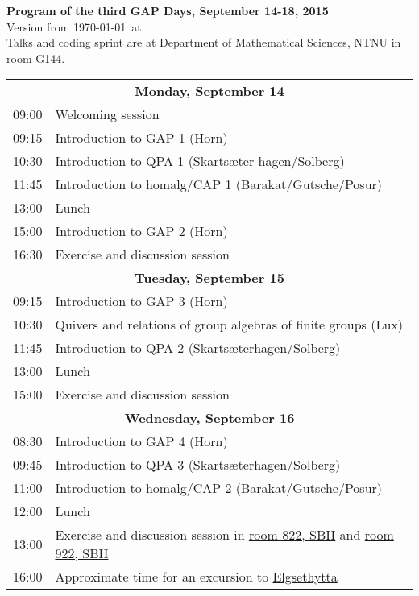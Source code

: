 \documentclass[12pt,a4paper]{article}
\begin{document}
\begin{center}
{\huge\textbf{Program of the third GAP Days, September 14-18, 2015}\\[2mm]}
Version from \today\ at \currenttime\\[2mm]
Talks and coding sprint are at
\href{http://www.ntnu.edu/imf)}{Department of Mathematical Sciences,
  NTNU} in room \href{http://s.mazemap.com/1RvAr1E}{G144}.
\end{center}

\newcommand{\talk}[3]{#1 & #2 \\ & \textit{#3} \\}

\newcommand{\newday}[1]{\multicolumn{2}{c}{{\large\textbf{#1}}} \\[1em]}


\begin{tabular}{rp{14.5cm}}
%
\newday{Monday, September 14}
09:00 & Welcoming session \\
09:15 & Introduction to GAP 1 (Horn)\\
10:30 & Introduction to QPA 1 (Skarts\ae ter hagen/Solberg)\\
11:45 & Introduction to homalg/CAP 1 (Barakat/Gutsche/Posur)\\
13:00 & Lunch \\
15:00 & Introduction to GAP 2 (Horn)\\
16:30 & Exercise and discussion session

%
%
\\
%
%
\newday{Tuesday, September 15}
09:15 & Introduction to GAP 3 (Horn)\\
10:30 & Quivers and relations of group algebras of finite groups (Lux) \\
11:45 & Introduction to QPA 2 (Skarts\ae terhagen/Solberg)\\
13:00 & Lunch \\
15:00 & Exercise and discussion session

%
%
\\
%
%
\newday{Wednesday, September 16}
08:30 & Introduction to GAP 4 (Horn)\\
09:45 & Introduction to QPA 3 (Skarts\ae terhagen/Solberg)\\
11:00 & Introduction to homalg/CAP 2 (Barakat/Gutsche/Posur)\\
12:00 & Lunch \\
13:00 & Exercise and discussion session in \href{http://s.mazemap.com/1eH0Iyb}{room 822, SBII} and
\href{http://s.mazemap.com/1FAC2wn}{room 922, SBII}\\
16:00 & Approximate time for an excursion to
\href{http://www.elgsethytta.com/public.aspx?pageid=88995}{Elgsethytta}
\end{tabular}
\end{document}
